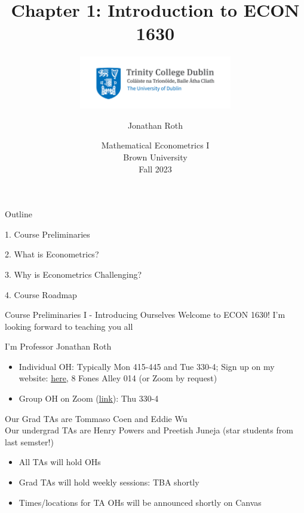 \documentclass[11pt,english,handout]{beamer}
\subtitle{
    \includegraphics[width=0.50\textwidth]{TCDlogo.jpg}
}
\begin{document}
\begin{frame}[noframenumbering]{}
\vspace{0.5cm}
\title[]{Chapter 1: Introduction to ECON 1630}
\author{Jonathan Roth}
\date{Mathematical Econometrics I \\ Brown University\\Fall 2023} 
\titlepage {\small{}\ }\thispagestyle{empty} \vspace{-30pt}

\end{frame}
 
\begin{frame}{Outline}

1. Course Preliminaries
\vspace{0.8cm}

2. What is Econometrics?
\vspace{0.8cm}

3. Why is Econometrics Challenging?
\vspace{0.8cm}

4. Course Roadmap

\end{frame}

\begin{frame}{Course Preliminaries I - Introducing Ourselves}
\vspace{0.2cm}
Welcome to ECON 1630! I'm looking forward to teaching you all
\vspace{0.5cm}


I'm Professor Jonathan Roth

\begin{itemize}
\item Individual OH: Typically Mon 415-445 and Tue 330-4; Sign up on my website: \href{https://jonathandroth.github.io/OfficeHours/}{\uline{here}}, 8 Fones Alley 014 (or Zoom by request)
\item Group OH on Zoom (\href{https://brown.zoom.us/j/96452999103}{\uline{link}}): Thu 330-4 
\end{itemize}
\vspace{0.4cm}

\pause{}

Our Grad TAs are Tommaso Coen and Eddie Wu \\

Our undergrad TAs are Henry Powers and Preetish Juneja (star students from last semster!)

\begin{itemize}
	\item
	All TAs will hold OHs 
	
	\item
	Grad TAs will hold weekly sessions: TBA shortly 
	
	\item
	Times/locations for TA OHs will be announced shortly on Canvas
\end{itemize}
 
\end{frame}
\end{document}
